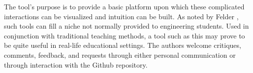 \documentclass{anstrans}
\begin{document}
The tool's purpose is to provide a basic platform upon which these complicated
interactions can be visualized and intuition can be built. As noted by Felder
\cite{felder2000learning}, such tools can fill a niche not normally provided to
engineering students. Used in conjunction with traditional teaching methods, a
tool such as this may prove to be quite useful in real-life educational
settings. The authors welcome critiques, comments, feedback, and requests
through either personal communication or through interaction with the Github
repository.



\end{document}
